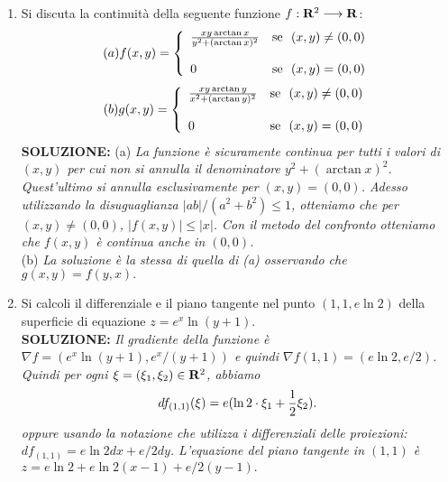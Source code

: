 \documentclass[12pt,a4paper]{report}\pagenumbering{roman}
\begin{document}
\begin{enumerate}
\item Si discuta la continuit\`a della seguente funzione $f:{\bf R}^2\longrightarrow
{\bf R}$:
$$(a) f(x,y)=\left\{\begin{array}{ll} {xy\arctan{x}\over y^2+(\arctan{x})^2} & 
\mbox{se}\ \ (x,y)\neq (0,0)\\ \\0&\mbox{se}\ \ (x,y)=(0,0)\end{array}\right.$$
$$(b) g(x,y)=\left\{\begin{array}{ll} {xy\arctan{y}\over x^2+(\arctan{y})^2} & 
\mbox{se}\ \ (x,y)\neq (0,0)\\ \\0&\mbox{se}\ \ (x,y)=(0,0)\end{array}\right.$$
{\bf SOLUZIONE:} (a) {\it La funzione \`e sicuramente continua per tutti i valori di $(x,y)$
per cui non si annulla il denominatore $y^2+(\arctan{x})^2$. Quest'ultimo si annulla esclusivamente
per $(x,y)=(0,0)$. Adesso utilizzando la disuguaglianza $|ab|/(a^2+b^2)\leq1$, otteniamo che
per $(x,y)\neq(0,0)$, $|f(x,y)|\leq |x|$. Con il metodo del confronto otteniamo che $f(x,y)$ \`e continua 
anche in $(0,0)$.}\\
(b) {\it La soluzione \`e la stessa di quella di (a) osservando che $g(x,y)=f(y,x).$}

\item Si calcoli il differenziale e il piano tangente nel punto $(1,1,e\ln2)$
della superficie di equazione $z=e^x\ln(y+1)$.\\
{\bf SOLUZIONE:} {\it Il gradiente della funzione \`e $\nabla f=(e^x\ln(y+1),e^x/(y+1))$ e
quindi $\nabla f(1,1)=(e\ln2,e/2)$. Quindi per ogni $\xi=(\xi_1,\xi_2)\in{\bf R}^2$, abbiamo
$$df_{(1,1)}(\xi)=e(\ln2\cdot\xi_1+{1\over2}\xi_2).$$
oppure usando la notazione che utilizza i differenziali delle proiezioni: $df_{(1,1)}=e\ln2dx
+e/2dy$. L'equazione del piano tangente in $(1,1)$ \`e $z=e\ln2+e\ln2(x-1)+e/2(y-1).$}


\end{enumerate}
\end{document}
